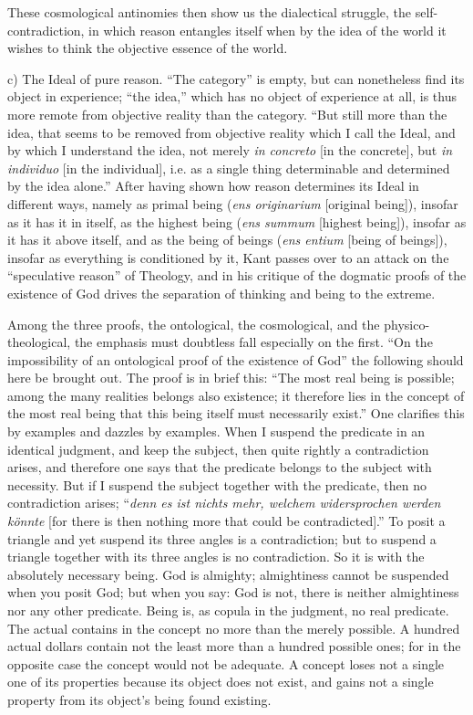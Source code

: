 \documentclass[12pt]{book}
\begin{document}
These cosmological antinomies then show us the dialectical struggle, the
self-contradiction, in which reason entangles itself when by the idea of the world
it wishes to think the objective essence of the world.

c) The Ideal of pure reason. ``The category'' is empty, but can nonetheless find
its object in experience; ``the idea,'' which has no object of experience at all,
is thus more remote from objective reality than the category. ``But still more
than the idea, that seems to be removed from objective reality which I call the
Ideal, and by which I understand the idea, not merely \textit{in concreto} [in the
concrete], but \textit{in individuo} [in the individual], i.e. as a single thing
determinable and determined by the idea alone.'' After having shown how reason
determines its Ideal in different ways, namely as primal being (\textit{ens
originarium} [original being]), insofar as it has it in itself, as the highest
being (\textit{ens summum} [highest being]), insofar as it has it above itself,
and as the being of beings (\textit{ens entium} [being of beings]), insofar as
everything is conditioned by it, Kant passes over to an attack on the
``speculative reason'' of Theology, and in his critique of the dogmatic proofs of
the existence of God drives the separation of thinking and being to the extreme.

Among the three proofs, the ontological, the cosmological, and the
physico-theological, the emphasis must doubtless fall especially on the first.
``On the impossibility of an ontological proof of the existence of God'' the
following should here be brought out. The proof is in brief this: ``The most real
being is possible; among the many realities belongs also existence; it therefore
lies in the concept of the most real being that this being itself must necessarily
exist.'' One clarifies this by examples and dazzles by examples. When I suspend the
predicate in an identical judgment, and keep the subject, then quite rightly a
contradiction arises, and therefore one says that the predicate belongs to the
subject with necessity. But if I suspend the subject together with the predicate,
then no contradiction arises; ``\textit{denn es ist nichts mehr, welchem
widersprochen werden könnte} [for there is then nothing more that could be
contradicted].'' To posit a triangle and yet suspend its three angles is a
contradiction; but to suspend a triangle together with its three angles is no
contradiction. So it is with the absolutely necessary being. God is almighty;
almightiness cannot be suspended when you posit God; but when you say: God is not,
there is neither almightiness nor any other predicate. Being is, as copula in the
judgment, no real predicate. The actual contains in the concept no more than the
merely possible. A hundred actual dollars contain not the least more than a
hundred possible ones; for in the opposite case the concept would not be adequate.
A concept loses not a single one of its properties because its object does not
exist, and gains not a single property from its object's being found existing.
\end{document}

